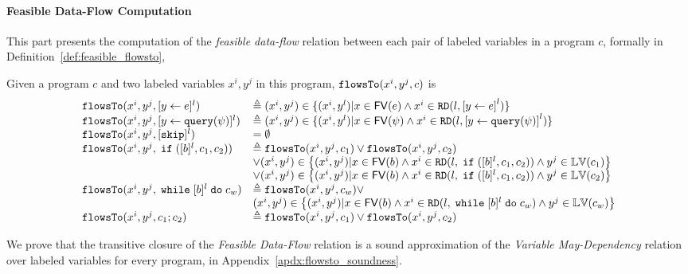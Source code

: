 \paragraph{Feasible Data-Flow Computation}
This part presents the computation of the \emph{feasible data-flow} relation between each pair of labeled variables in a program $c$,
formally in Definition~\ref{def:feasible_flowsto}, 
%
%
\begin{defn}
  \label{def:feasible_flowsto}
  Given a program $c$ and two labeled variables $x^i, y^j$  in this program, 
  $\mathtt{flowsTo}(x^i, y^j, c)$ is 
    {\small
    \[
   \begin{array}{ll}
    \flowsto(x^i, y^j, \clabel{\assign{y}{\expr}}{}^l)  & \triangleq (x^i, y^j) \in \{ (x^i, y^l) | x \in \mathsf{FV}(\expr) 
    \land x^i \in \live(l, \clabel{\assign{y}{\expr}}^l) \}  \\
    \flowsto(x^i, y^j, \clabel{\assign{y}{\query(\qexpr)}}{}^l)  & \triangleq (x^i, y^j) \in \{ (x^i, y^l) | x \in \mathsf{FV}(\qexpr) 
    \land x^i \in \live(l,\clabel{\assign{y}{\query(\qexpr)}}^l) \}  \\
    \flowsto(x^i, y^j, [\eskip]^{l})  & = \emptyset \\
    \flowsto(x^i, y^j, \eif ([b]^l, c_1, c_2))  & \triangleq \flowsto(x^i, y^j, c_1) \lor \flowsto(x^i, y^j, c_2) \\ 
        & \lor (x^i, y^j) \in
        \left\{(x^i,y^j) | x \in \mathsf{FV}(b) \land 
      x^i \in \live(l, \eif ([b]^l, c_1, c_2)) \land  y^j \in \lvar(c_1) \right\} \\
       &\lor (x^i, y^j) \in \left\{(x^i,y^j) | x \in \mathsf{FV}(b) \land 
      x^i\in \live(l, \eif ([b]^l, c_1, c_2))  \land  y^j \in \lvar(c_2)  \right\} \\
       \flowsto(x^i, y^j, \ewhile [b]^l \edo c_w)  & \triangleq  \flowsto(x^i, y^j, c_w)  \lor
       \\ & 
       (x^i, y^j) \in  \left\{(x^i,y^j) | x \in \mathsf{FV}(b) \land 
      x^i \in \live(l,   \ewhile [b]^l \edo c_w) \land  y^j \in \lvar(c_w) \right\} \\
       \flowsto(x^i, y^j, c_1 ;c_2)  & \triangleq \flowsto(x^i, y^j, c_1) \lor \flowsto(x^i, y^j, c_2) \\
   \end{array}
   \]
   }
   \end{defn}
%
We prove that the transitive closure of the \emph{Feasible Data-Flow} relation is a sound approximation 
of the \emph{Variable May-Dependency} relation over labeled variables for every program,
in Appendix~\ref{apdx:flowsto_soundness}.
%

